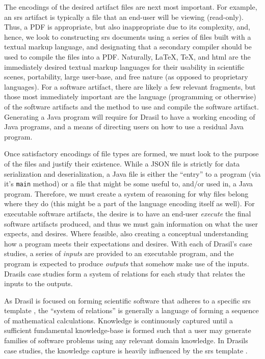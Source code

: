 The encodings of the desired artifact files are next most important. For
example, an \acs{srs} artifact is typically a file that an end-user will be
viewing (read-only). Thus, a PDF is appropriate, but also inappropriate due to
its complexity, and, hence, we look to constructing \acs{srs} documents using a
series of files built with a textual markup language, and designating that a
secondary compiler should be used to compile the files into a PDF. Naturally,
\LaTeX{}, \TeX{}, and \acs{html} are the immediately desired textual markup
languages for their usability in scientific scenes, portability, large
user-base, and free nature (as opposed to proprietary languages). For a software
artifact, there are likely a few relevant fragments, but those most immediately
important are the language (programming or otherwise) of the software artifacts
and the method to use and compile the software artifact. Generating a Java
program will require for Drasil to have a working encoding of Java programs, and
a means of directing users on how to use a residual Java program.

Once satisfactory encodings of file types are formed, we must look to the
purpose of the files and justify their existence. While a JSON file is strictly
for data serialization and deserialization, a Java file is either the ``entry''
to a program (via it's \texttt{main} method) or a file that might be some useful
to, and/or used in, a Java program. Therefore, we must create a system of
reasoning for why files belong where they do (this might be a part of the
language encoding itself as well). For executable software artifacts, the desire
is to have an end-user \textit{execute} the final software artifacts produced,
and thus we must gain information on what the user expects, and desires. Where
feasible, also creating a conceptual understanding how a program meets their
expectations and desires. With each of Drasil's case studies, a series of
\textit{inputs} are provided to an executable program, and the program is
expected to produce \textit{outputs} that somehow make use of the inputs.
Drasils case studies form a system of relations for each study that relates the
inputs to the outputs.

As Drasil is focused on forming scientific software that adheres to a specific
\acs{srs} template \cite{SmithAndLai2005}, the ``system of relations'' is
generally a language of forming a sequence of mathematical calculations.
Knowledge is continuously captured until a sufficient fundamental knowledge-base
is formed such that a user may generate families of software problems using any
relevant domain knowledge. In Drasils case studies, the knowledge capture is
heavily influenced by the \acs{srs} template \cite{SmithAndLai2005}.

